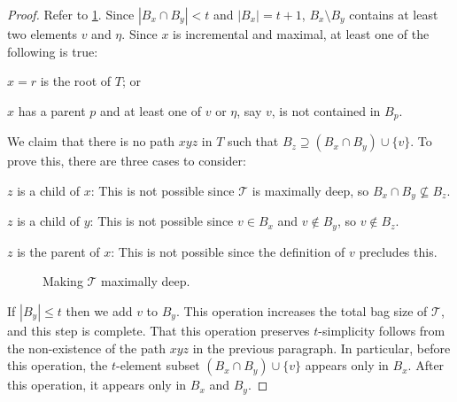 \documentclass[kpfonts]{patmorin}
\theoremstyle{named}
\begin{document}
\begin{proof}
    Refer to \cref{tough-one}.
    Since $|B_x\cap B_y|< t$ and $|B_x|=t+1$, $B_x\setminus B_y$ contains at least two elements $v$ and $\eta$.  Since $x$ is incremental and maximal, at least one of the following is true:
    \begin{inparaenum}[(i)]
        \item $x=r$ is the root of $T$; or
        \item $x$ has a parent $p$ and at least one of $v$ or $\eta$, say $v$, is not contained in $B_p$.
    \end{inparaenum}
    We claim that there is no path $xyz$ in $T$ such that $B_z\supseteq (B_x\cap B_y)\cup\{v\}$. To prove this, there are three cases to consider:
    \begin{compactenum}
        \item $z$ is a child of $x$:  This is not possible since $\mathcal{T}$ is maximally deep, so $B_x\cap B_y\not\subseteq B_z$.
        \item $z$ is a child of $y$:  This is not possible since $v\in B_x$ and $v\not\in B_y$, so $v\not\in B_z$.
        \item $z$ is the parent of $x$:  This is not possible since the definition of $v$ precludes this.
    \end{compactenum}
    \begin{figure}
        \caption{Making $\mathcal{T}$ maximally deep.}
        \label{tough-one}
    \end{figure}

    If $|B_y|\le t$ then we add $v$ to $B_y$.  This operation increases the total bag size of $\mathcal{T}$, and this step is complete.  That this operation preserves $t$-simplicity follows from the non-existence of the path $xyz$ in the previous paragraph.  In particular, before this operation, the $t$-element subset $(B_x\cap B_y)\cup\{v\}$ appears only in $B_x$. After this operation, it appears only in $B_x$ and $B_y$.


\end{proof}
\end{document}
